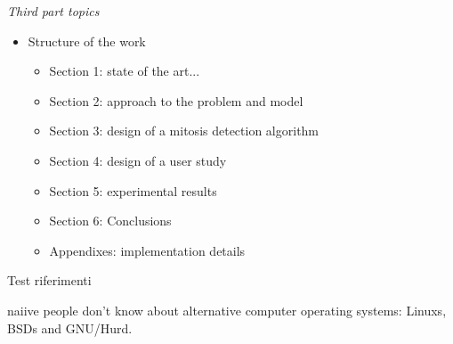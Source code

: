 \emph{Third part topics}

\begin{itemize}
\item Structure of the work
	\begin{itemize}
	\item Section 1: state of the art...
	\item Section 2: approach to the problem and model
	\item Section 3: design of a mitosis detection algorithm
	\item Section 4: design of a user study
	\item Section 5: experimental results
	\item Section 6: Conclusions
	\item Appendixes: implementation details
	\end{itemize}
\end{itemize}








Test riferimenti \cite{SVM01}

\Gls{naiive} people don't know about alternative \gls{computer} operating systems: \glspl{Linux}, BSDs and GNU/Hurd.